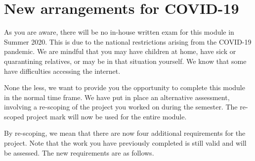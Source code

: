 \documentclass[12pt, a4paper]{article}
\title{\projectname}
\author{\modulename}
\date{Due: \duedate}
\begin{document}
\section*{New arrangements for COVID-19}

As you are aware, there will be no in-house written exam for this module in Summer 2020.
This is due to the national restrictions arising from the COVID-19 pandemic.
We are mindful that you may have children at home, have sick or quarantining relatives, or may be in that situation yourself.
We know that some have difficulties accessing the internet.

None the less, we want to provide you the opportunity to complete this module in the normal time frame.
We have put in place an alternative assessment, involving a re-scoping of the project you worked on during the semester.
The re-scoped project mark will now be used for the entire module.

By re-scoping, we mean that there are now four additional requirements for the project.
Note that the work you have previously completed is still valid and will be assessed.
The new requirements are as follows.
\end{document}
